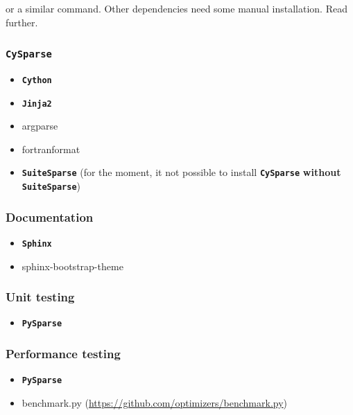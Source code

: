 \documentclass[letterpaper,10pt,english]{sphinxmanual}
\begin{document}
or a similar command. Other dependencies need some manual installation. Read further.


\subsubsection{\textbf{\texttt{CySparse}}}
\label{installation:cysparse}\begin{itemize}
\item {} 
\textbf{\texttt{Cython}}

\item {} 
\textbf{\texttt{Jinja2}}

\item {} 
argparse

\item {} 
fortranformat

\item {} 
\textbf{\texttt{SuiteSparse}} (for the moment, it not possible to install \textbf{\texttt{CySparse}} \textbf{without} \textbf{\texttt{SuiteSparse}})

\end{itemize}


\subsubsection{Documentation}
\label{installation:documentation}\begin{itemize}
\item {} 
\textbf{\texttt{Sphinx}}

\item {} 
sphinx-bootstrap-theme

\end{itemize}


\subsubsection{Unit testing}
\label{installation:unit-testing}\begin{itemize}
\item {} 
\textbf{\texttt{PySparse}}

\end{itemize}


\subsubsection{Performance testing}
\label{installation:performance-testing}\begin{itemize}
\item {} 
\textbf{\texttt{PySparse}}

\item {} 
benchmark.py (\href{https://github.com/optimizers/benchmark.py}{https://github.com/optimizers/benchmark.py})

\end{itemize}
\end{document}
